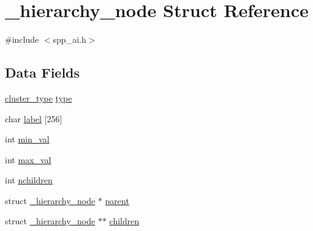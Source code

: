 \hypertarget{struct__hierarchy__node}{
\section{\_\-hierarchy\_\-node Struct Reference}
\label{struct__hierarchy__node}
}


{\ttfamily \#include $<$spp\_\-ai.h$>$}

\subsection*{Data Fields}
\begin{DoxyCompactItemize}
\item 
\hyperlink{spp__ai_8h_ae2ff3c6586aa2ab211a102abfde86640}{cluster\_\-type} \hyperlink{struct__hierarchy__node_a3b18e3ddfa2212c5e4ff9c0b4bde4296}{type}
\item 
char \hyperlink{struct__hierarchy__node_ae498f6fd14ca058a3ae0a95d5425451a}{label} \mbox{[}256\mbox{]}
\item 
int \hyperlink{struct__hierarchy__node_a13ceebd7b435b9ef347fb90d9e6bbfe4}{min\_\-val}
\item 
int \hyperlink{struct__hierarchy__node_a79ea88029938dc30ab8f159405d12c87}{max\_\-val}
\item 
int \hyperlink{struct__hierarchy__node_a849256ce1039e2cefaaf64d91171be0a}{nchildren}
\item 
struct \hyperlink{struct__hierarchy__node}{\_\-hierarchy\_\-node} $\ast$ \hyperlink{struct__hierarchy__node_a5c94c89d7e2aea393f1c550afb766bbe}{parent}
\item 
struct \hyperlink{struct__hierarchy__node}{\_\-hierarchy\_\-node} $\ast$$\ast$ \hyperlink{struct__hierarchy__node_afc23d4fe6426873164cdaab2f3d4f0cd}{children}
\end{DoxyCompactItemize}


